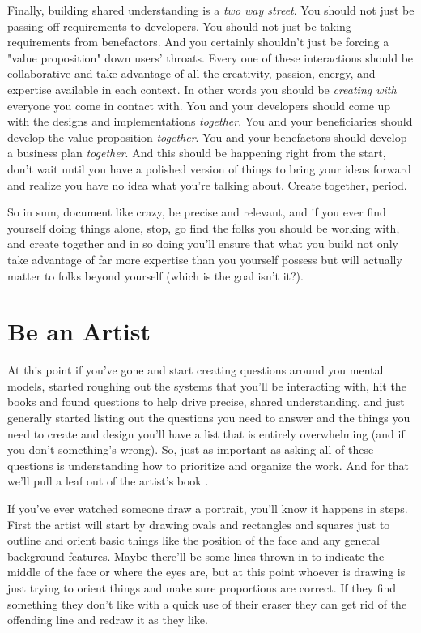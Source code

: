 \documentclass[11pt,a5paper]{book}
\begin{document}
Finally, building shared understanding is a \textit{two way street}. You should not just be passing off requirements to developers. You should not just be taking requirements from benefactors. And you certainly shouldn't just be forcing a "value proposition" down users' throats. Every one of these interactions should be collaborative and take advantage of all the creativity, passion, energy, and expertise available in each context. In other words you should be \textit{creating with} everyone you come in contact with. You and your developers should come up with the designs and implementations \textit{together}. You and your beneficiaries should develop the value proposition \textit{together}. You and your benefactors should develop a business plan \textit{together}. And this should be happening right from the start, don't wait until you have a polished version of things to bring your ideas forward and realize you have no idea what you're talking about. Create together, period.
\newline

So in sum, document like crazy, be precise and relevant, and if you ever find yourself doing things alone, stop, go find the folks you should be working with, and create together and in so doing you'll ensure that what you build not only take advantage of far more expertise than you yourself possess but will actually matter to folks beyond yourself (which is the goal isn't it?).

\section{Be an Artist}
At this point if you've gone and start creating questions around you mental models, started roughing out the systems that you'll be interacting with, hit the books and found questions to help drive precise, shared understanding, and just generally started listing out the questions you need to answer and the things you need to create and design you'll have a list that is entirely overwhelming (and if you don't something's wrong). So, just as important as asking all of these questions is understanding how to prioritize and organize the work. And for that we'll pull a leaf out of the artist's book \cite{patton}.
\newline

If you've ever watched someone draw a portrait, you'll know it happens in steps. First the artist will start by drawing ovals and rectangles and squares just to outline and orient basic things like the position of the face and any general background features. Maybe there'll be some lines thrown in to indicate the middle of the face or where the eyes are, but at this point whoever is drawing is just trying to orient things and make sure proportions are correct. If they find something they don't like with a quick use of their eraser they can get rid of the offending line and redraw it as they like. 
\newline
\end{document}
